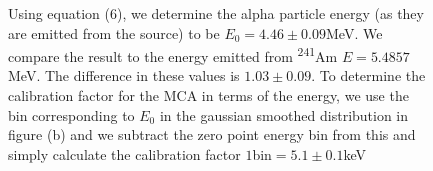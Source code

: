 \documentclass[a4paper]{article}
\begin{document}
\begin{figure}[!htb]
\caption{
Using equation (6), we determine the alpha particle energy (as they are emitted from the source) to be $E_0 = 4.46 \pm 0.09$MeV. We compare the result to the energy emitted from \textsuperscript{241}Am $E = 5.4857$ MeV\cite{SPA}. The difference in these values is $1.03 \pm 0.09$.
To determine the calibration factor for the MCA in terms of the energy, we use the bin corresponding to $E_0$ in the gaussian smoothed distribution in figure (b) and we subtract the zero point energy bin from this and simply calculate the calibration factor $1$bin$ = 5.1 \pm 0.1$keV
}
\end{figure}
\end{document}
